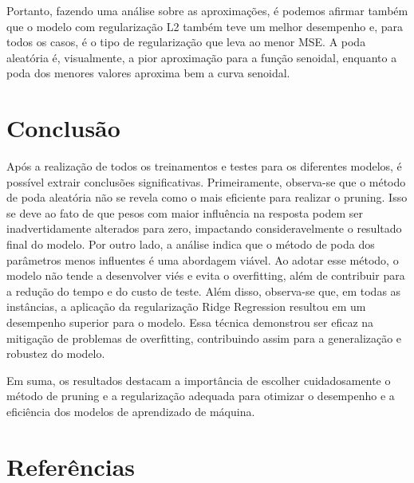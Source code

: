 \documentclass{article}
\begin{document}
\vspace{25pt}

Portanto, fazendo uma análise sobre as aproximações, é podemos afirmar também que o modelo com regularização L2 também teve um melhor desempenho  e, para todos os casos, é o tipo de regularização que leva ao menor MSE. A poda aleatória é, visualmente, a pior aproximação para a função senoidal, enquanto a poda dos menores valores aproxima bem a curva senoidal.

\vspace{25pt}

\section*{Conclusão}

\vspace{20pt}

Após a realização de todos os treinamentos e testes para os diferentes modelos, é possível extrair conclusões significativas. Primeiramente, observa-se que o método de poda aleatória não se revela como o mais eficiente para realizar o pruning. Isso se deve ao fato de que pesos com maior influência na resposta podem ser inadvertidamente alterados para zero, impactando consideravelmente o resultado final do modelo. Por outro lado, a análise indica que o método de poda dos parâmetros menos influentes é uma abordagem viável. Ao adotar esse método, o modelo não tende a desenvolver viés e evita o overfitting, além de contribuir para a redução do tempo e do custo de teste. Além disso, observa-se que, em todas as instâncias, a aplicação da regularização Ridge Regression resultou em um desempenho superior para o modelo. Essa técnica demonstrou ser eficaz na mitigação de problemas de overfitting, contribuindo assim para a generalização e robustez do modelo.

\vspace{10pt}

Em suma, os resultados destacam a importância de escolher cuidadosamente o método de pruning e a regularização adequada para otimizar o desempenho e a eficiência dos modelos de aprendizado de máquina.

\newpage

\section*{Referências}

\vspace{20pt}
\end{document}
